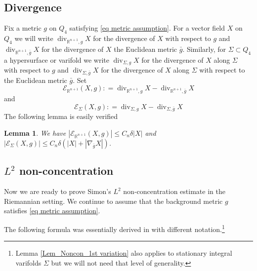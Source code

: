 \documentclass[11pt, letterpaper, reqno]{amsart}
\numberwithin{equation}{section}
\newtheorem{Lem}[Def]{Lemma}
\theoremstyle{remark}
\newcommand{\RR}{\mathbb{R}}
\newcommand{\cE}{\mathcal{E}}
\newcommand{\Div}{\operatorname{div}}
\begin{document}
     \subsection{Divergence}
   Fix a metric $g$ on $Q_4$ satisfying \eqref{eq metric assumption}. For a vector field $X$ on $Q_4$ we will write $\Div_{\RR^{n+1},g} X$ for the divergence of $X$ with respect to $g$ and $\Div_{\RR^{n+1},\bar g} X$ for the divergence of $X$ the Euclidean metric $\bar g$. Similarly, for $\Sigma\subset Q_4$ a hypersurface or varifold we write $\Div_{\Sigma,g} X$ for the divergence of $X$ along $\Sigma$ with respect to $g$ and $\Div_{\Sigma,\bar g}X$ for the divergence of $X$ along $\Sigma$ with respect to the Euclidean metric $\bar g$.    Set
   \[
   \cE_{\RR^{n+1}}(X,g) : = \Div_{\RR^{n+1},g} X - \Div_{\RR^{n+1},\bar g} X
   \]
   and
\[
\cE_{\Sigma}(X,g) : = \Div_{\Sigma,g} X - \Div_{\Sigma,\bar g} X 
\]
The following lemma is easily verified
\begin{Lem}\label{lemm div g bar g}
We have $|\cE_{\RR^{n+1}}(X,g)| \leq C_n \delta |X|$ and $|\cE_{\Sigma}(X,g)| \leq C_n  \delta(|X|+|\nabla_{\bar g} X|) $.
\end{Lem}
   

  \subsection{$L^2$ non-concentration}
   Now we are ready to prove Simon's $L^2$ non-concentration estimate in the Riemannian setting. We continue to assume that the background metric $g$ satisfies \eqref{eq metric assumption}. 
   
   The following formula was essentially derived in \cite[Lemma 2.2, (24)]{Simon:uniqueness.some} with different notation.\footnote{Lemma \ref{Lem_Noncon_1st variation} also applies to stationary integral varifolds $\Sigma$ but we will not need that level of generality.}
   
\end{document}
